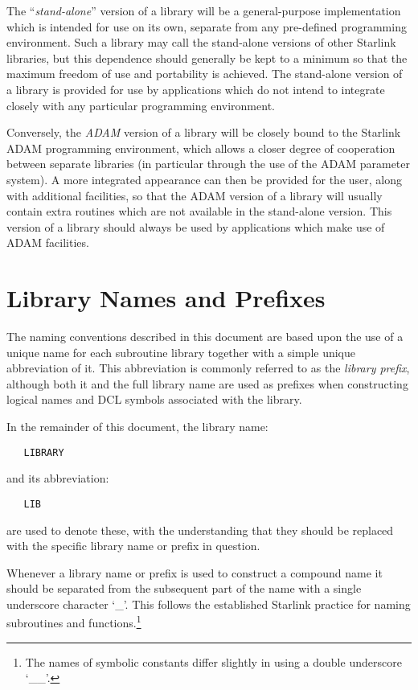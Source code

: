 The ``{\em stand-alone}'' version of a library will be a general-purpose
implementation which is intended for use on its own, separate from any
pre-defined programming environment. 
Such a library may call the stand-alone versions of other Starlink
libraries, but this dependence should generally be kept to a minimum so that
the maximum freedom of use and portability is achieved. 
The stand-alone version of a library is provided for use by applications
which do not intend to integrate closely with any particular programming
environment. 

Conversely, the {\em ADAM} version of a library will be closely bound to the
Starlink ADAM programming environment, which allows a closer degree of
cooperation between separate libraries (in particular through the use of the
ADAM parameter system). 
A more integrated appearance can then be provided for the user, along with
additional facilities, so that the ADAM version of a library will usually
contain extra routines which are not available in the stand-alone version. 
This version of a library should always be used by applications which make
use of ADAM facilities. 


\section{Library Names and Prefixes}

The naming conventions described in this document are based upon the use of
a unique name for each subroutine library together with a simple unique
abbreviation of it.
This abbreviation is commonly referred to as the {\em library prefix},
although both it and the full library name are used as prefixes when
constructing logical names and DCL symbols associated with the library. 

In the remainder of this document, the library name:

\begin{verbatim}
   LIBRARY
\end{verbatim}

and its abbreviation:

\begin{verbatim}
   LIB
\end{verbatim}

are used to denote these, with the understanding that they should be
replaced with the specific library name or prefix in question. 

Whenever a library name or prefix is used to construct a compound name it
should be separated from the subsequent part of the name with a single
underscore character `\_'. 
This follows the established Starlink practice for naming subroutines and
functions.\footnote{The names of symbolic constants differ slightly in using
a double underscore `\_\_'.} 

